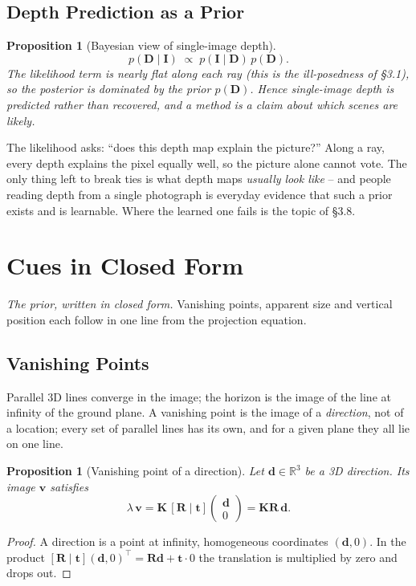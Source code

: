 \documentclass[11pt,a4paper]{article}
\newcommand{\R}{\mathbb{R}}
\theoremstyle{definition}
\theoremstyle{plain}
\newtheorem{proposition}[definition]{Proposition}
\theoremstyle{remark}
\begin{document}
\subsection{Depth Prediction as a Prior }
 
\begin{proposition}[Bayesian view of single-image depth]\label{prop:bayes}
\[
p(\bm D\mid \bm I)\;\propto\; p(\bm I\mid \bm D)\,p(\bm D).
\]
The likelihood term is nearly flat along each ray (this is the ill-posedness of \S3.1), so the posterior is dominated by the prior $p(\bm D)$. Hence single-image depth is \emph{predicted} rather than \emph{recovered}, and a method is a claim about which scenes are likely.
\end{proposition}
 
\begin{intuition}
The likelihood asks: ``does this depth map explain the picture?'' Along a ray, every depth explains the pixel equally well, so the picture alone cannot vote. The only thing left to break ties is what depth maps \emph{usually look like} -- and people reading depth from a single photograph is everyday evidence that such a prior exists and is learnable. Where the learned one fails is the topic of \S3.8.
\end{intuition}
 
\section{Cues in Closed Form }
\emph{The prior, written in closed form.} Vanishing points, apparent size and vertical position each follow in one line from the projection equation.
 
\subsection{Vanishing Points }
 
Parallel 3D lines converge in the image; the horizon is the image of the line at infinity of the ground plane. A vanishing point is the image of a \emph{direction}, not of a location; every set of parallel lines has its own, and for a given plane they all lie on one line.
 
\begin{proposition}[Vanishing point of a direction]\label{prop:vp}
Let $\bm d\in\R^3$ be a 3D direction. Its image $\bm v$ satisfies
\[
\lambda\,\bm v=\bm K\,[\bm R\mid\bm t]\begin{pmatrix}\bm d\\0\end{pmatrix}=\bm K\bm R\,\bm d .
\]
\end{proposition}
\begin{proof}
A direction is a point at infinity, homogeneous coordinates $(\bm d,0)$. In the product $[\bm R\mid\bm t](\bm d,0)^\top=\bm R\bm d+\bm t\cdot0$ the translation is multiplied by zero and drops out. \qedhere
\end{proof}
 
\end{document}
